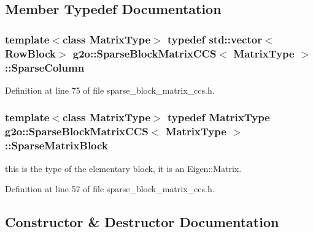 \subsection{Member Typedef Documentation}
\subsubsection[{\texorpdfstring{Sparse\+Column}{SparseColumn}}]{\setlength{\rightskip}{0pt plus 5cm}template$<$class Matrix\+Type$>$ typedef std\+::vector$<${\bf Row\+Block}$>$ {\bf g2o\+::\+Sparse\+Block\+Matrix\+C\+CS}$<$ Matrix\+Type $>$\+::{\bf Sparse\+Column}}\hypertarget{classg2o_1_1SparseBlockMatrixCCS_a4fc5dfe0a9ff9bd62065ca4b17f25bc1}{}\label{classg2o_1_1SparseBlockMatrixCCS_a4fc5dfe0a9ff9bd62065ca4b17f25bc1}


Definition at line 75 of file sparse\+\_\+block\+\_\+matrix\+\_\+ccs.\+h.

\subsubsection[{\texorpdfstring{Sparse\+Matrix\+Block}{SparseMatrixBlock}}]{\setlength{\rightskip}{0pt plus 5cm}template$<$class Matrix\+Type$>$ typedef Matrix\+Type {\bf g2o\+::\+Sparse\+Block\+Matrix\+C\+CS}$<$ Matrix\+Type $>$\+::{\bf Sparse\+Matrix\+Block}}\hypertarget{classg2o_1_1SparseBlockMatrixCCS_a41ea1c8c9d94a25544903ae8345c0354}{}\label{classg2o_1_1SparseBlockMatrixCCS_a41ea1c8c9d94a25544903ae8345c0354}


this is the type of the elementary block, it is an Eigen\+::\+Matrix. 



Definition at line 57 of file sparse\+\_\+block\+\_\+matrix\+\_\+ccs.\+h.



\subsection{Constructor \& Destructor Documentation}
